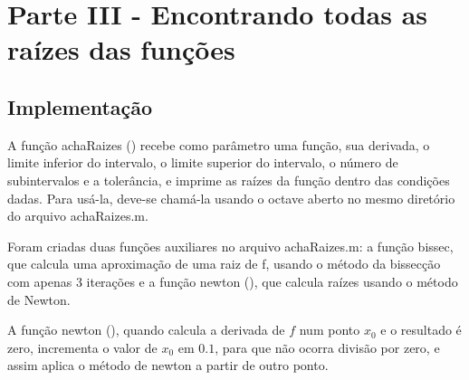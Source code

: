 \documentclass{article}
\begin{document}
\section{Parte III - Encontrando todas as raízes das funções}
\subsection{Implementação}
A função achaRaizes () recebe como parâmetro uma função, sua derivada, o limite inferior do intervalo, o limite superior do intervalo, o número de subintervalos e a tolerância, e imprime as raízes da função dentro das condições dadas. Para usá-la, deve-se chamá-la usando o octave aberto no mesmo diretório do arquivo achaRaizes.m.

Foram criadas duas funções auxiliares no arquivo achaRaizes.m: a função bissec, que calcula uma aproximação de uma raiz de f, usando o método da bissecção com apenas 3 iterações e a função newton (), que calcula raízes usando o método de Newton.

A função newton (), quando calcula a derivada de $f$ num ponto $x_{0}$ e o resultado é zero, incrementa o valor de $x_{0}$ em $0.1$, para que não ocorra divisão por zero, e assim aplica o método de newton a partir de outro ponto.
\end{document}
